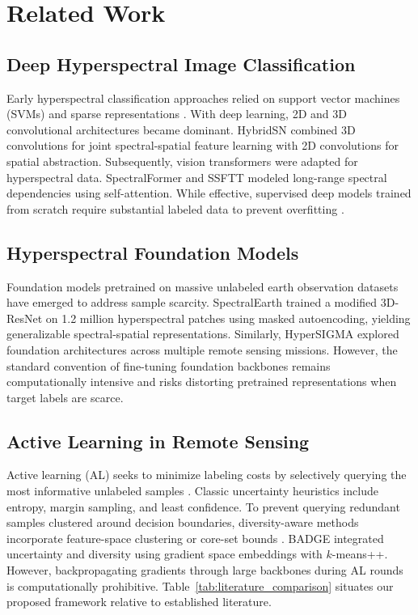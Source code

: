 \documentclass[conference,letterpaper]{IEEEtran}
\begin{document}
\section{Related Work}

\subsection{Deep Hyperspectral Image Classification}
Early hyperspectral classification approaches relied on support vector machines (SVMs) and sparse representations \cite{tuia2011,li2013}. With deep learning, 2D and 3D convolutional architectures became dominant. HybridSN \cite{roy2020} combined 3D convolutions for joint spectral-spatial feature learning with 2D convolutions for spatial abstraction. Subsequently, vision transformers were adapted for hyperspectral data. SpectralFormer \cite{hong2022} and SSFTT \cite{he2022} modeled long-range spectral dependencies using self-attention. While effective, supervised deep models trained from scratch require substantial labeled data to prevent overfitting \cite{zhong2023}.

\subsection{Hyperspectral Foundation Models}
Foundation models pretrained on massive unlabeled earth observation datasets have emerged to address sample scarcity. SpectralEarth \cite{braham2025} trained a modified 3D-ResNet on 1.2 million hyperspectral patches using masked autoencoding, yielding generalizable spectral-spatial representations. Similarly, HyperSIGMA \cite{wang2025} explored foundation architectures across multiple remote sensing missions. However, the standard convention of fine-tuning foundation backbones remains computationally intensive and risks distorting pretrained representations when target labels are scarce.

\subsection{Active Learning in Remote Sensing}
Active learning (AL) seeks to minimize labeling costs by selectively querying the most informative unlabeled samples \cite{settles2009,tuia2016}. Classic uncertainty heuristics include entropy, margin sampling, and least confidence. To prevent querying redundant samples clustered around decision boundaries, diversity-aware methods incorporate feature-space clustering or core-set bounds \cite{sener2018}. BADGE \cite{ash2019} integrated uncertainty and diversity using gradient space embeddings with $k$-means++. However, backpropagating gradients through large backbones during AL rounds is computationally prohibitive. Table~\ref{tab:literature_comparison} situates our proposed framework relative to established literature.
\end{document}
